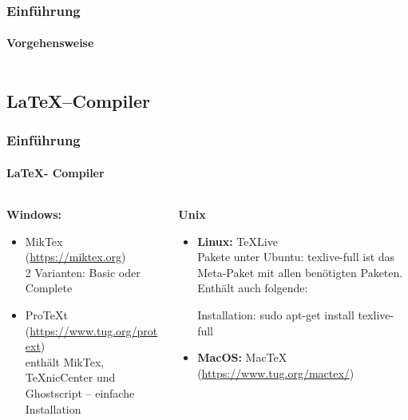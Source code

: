 \begin{frame}
\frametitle{Einführung}
\framesubtitle{Vorgehensweise}
\begin{columns}[onlytextwidth]
\begin{column}{0.40\textwidth}
\end{column}
\begin{column}{0.25\textwidth}
\end{column}
\begin{column}{0.25\textwidth}
\end{column}
\end{columns}
\end{frame}




\subsection{\LaTeX --Compiler}
\begin{frame}
\frametitle{Einführung}
\framesubtitle{\LaTeX - Compiler}
\begin{columns}[t]
\begin{column}{.4\textwidth}
\textbf{Windows:}\\
\begin{itemize}
  \item MikTex (\url{https://miktex.org})\\
   2 Varianten: Basic oder Complete
  \item ProTeXt (\url{https://www.tug.org/protext})\\
   enthält MikTex, TeXnicCenter und Ghostscript – einfache Installation\\
\end{itemize}
\end{column}
\begin{column}{.6\textwidth}
\textbf{Unix}
\begin{itemize}
  \item \textbf{Linux:} TeXLive\\
Pakete unter Ubuntu: {\ttfamily texlive-full} ist das Meta-Paket mit allen
ben\"otigten Paketen. Enthält auch folgende:
Installation: {\ttfamily sudo apt-get install texlive-full}
\item \textbf{MacOS:} MacTeX (\url{https://www.tug.org/mactex/})\\
\end{itemize}
\end{column}
\end{columns}
\end{frame}

